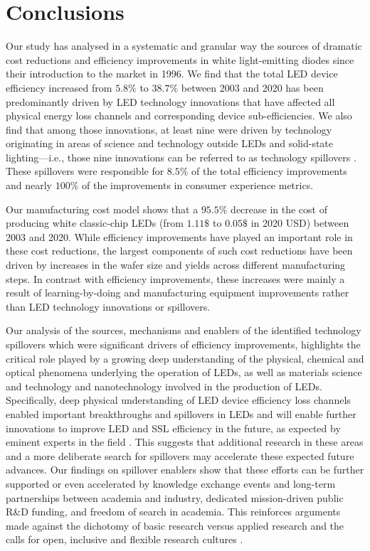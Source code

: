 \documentclass[twoside,twocolumn,9pt]{article}
\begin{document}
\section{Conclusions}
Our study has analysed in a systematic and granular way the sources of dramatic cost reductions and efficiency improvements in white light-emitting diodes since their introduction to the market in 1996. We find that the total LED device efficiency increased from $5.8\%$ to $38.7\%$ between 2003 and 2020 has been predominantly driven by LED technology innovations that have affected all physical energy loss channels and corresponding device sub-efficiencies. We also find that among those innovations, at least nine were driven by technology originating in areas of science and technology outside LEDs and solid-state lighting—i.e., those nine innovations can be referred to as technology spillovers . These spillovers were responsible for $8.5\%$ of the total efficiency improvements and nearly $100\%$ of the improvements in consumer experience metrics. 

Our manufacturing cost model shows that a $95.5\%$ decrease in the cost of producing white classic-chip LEDs (from $1.11\$$ to $0.05\$$ in 2020 USD) between 2003 and 2020. While efficiency improvements have played an important role in these cost reductions, the largest components of such cost reductions have been driven by increases in the wafer size and yields across different manufacturing steps. In contrast with efficiency improvements, these increases were mainly a result of learning-by-doing and manufacturing equipment improvements rather than LED technology innovations or spillovers. 

Our analysis of the sources, mechanisms and enablers of the identified technology spillovers which were significant drivers of efficiency improvements, highlights the critical role played by a growing deep understanding of the physical, chemical and optical phenomena underlying the operation of LEDs, as well as materials science and technology and nanotechnology involved in the production of LEDs. Specifically, deep physical understanding of LED device efficiency loss channels enabled important breakthroughs and spillovers in LEDs and will enable further innovations to improve LED and SSL efficiency in the future, as expected by eminent experts in the field \cite{Weisbuch2020}. This suggests that additional research in these areas and a more deliberate search for spillovers may accelerate these expected future advances. Our findings on spillover enablers show that these efforts can be further supported or even accelerated by knowledge exchange events and long-term partnerships between academia and industry, dedicated mission-driven public R\&D funding, and freedom of search in academia. This reinforces arguments made against the dichotomy of basic research versus applied research \cite{narayanamurti2016cycles} \cite{narayanamurti2021genesis} and the calls for open, inclusive and flexible research cultures \cite{Stephan2021}.
\end{document}
